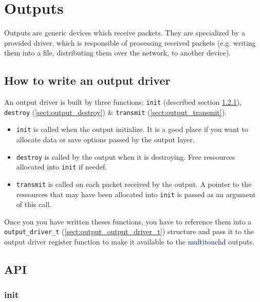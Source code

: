 \chapter{Outputs}

Outputs are generic devices which receive packets. They are specialized
by a provided driver, which is responsible of processing
received packets (e.g. writing them into a file, distributing them over the 
network, to another device).

%
%
\section{How to write an output driver}

An output driver is built by three functions: \texttt{init} 
(described section \ref{sect:output_init}),
\texttt{destroy} (\ref{sect:output_destroy}) \& \texttt{transmit}
(\ref{sect:output_transmit}).

\begin{itemize}
\item \texttt{init} is called when the output 
initialize. It is a good place if you want to allocate data or 
save options passed by the output layer.
\item \texttt{destroy} is called by the output when it 
is destroying. Free ressources allocated into \texttt{init} if
needef.
\item \texttt{transmit} is called on each packet received by 
the output. A pointer to the ressources that may have been
allocated into \texttt{init} is passed as an argument of this
call.
\end{itemize}

Once you you have written theses functions, you have to reference them
into a \texttt{output\_driver\_t} (\ref{sect:output_output_driver_t})
structure and pass it to the output driver register function to make
it available to the \textcolor{darkblue}{multitouchd} outputs.

%
%
\section{API}

%
%
\subsection{init}
\label{sect:output_init}

